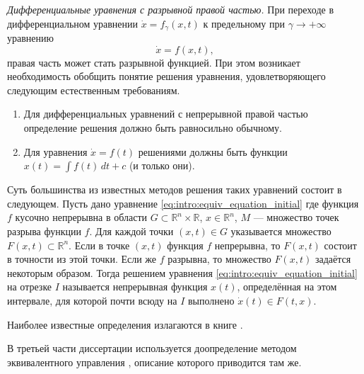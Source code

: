 \textit{Дифференциальные уравнения с разрывной правой частью.} При переходе в дифференциальном уравнении 
$\dot{x} = f_\gamma(x, t)$ к предельному при $\gamma \to +\infty$ уравнению
\begin{equation}
	\label{eq:intro:equiv_equation_initial}
	\dot{x} = f(x, t),
\end{equation}
правая часть может стать разрывной функцией. При этом возникает необходимость обобщить понятие решения уравнения, удовлетворяющего следующим естественным требованиям.
\begin{enumerate}
	\item Для дифференциальных уравнений с непрерывной правой частью определение решения должно быть равносильно обычному.
	\item Для уравнения $\dot{x} = f(t)$ решениями должны быть функции $x(t) = \int f(t)\, dt + c$ (и только они).
\end{enumerate}
Суть большинства из известных методов решения таких уравнений состоит в следующем. Пусть дано уравнение \eqref{eq:intro:equiv_equation_initial} где функция $f$ кусочно непрерывна в области $G \subset \mathbb{R}^n \times \mathbb{R}$, $x \in \mathbb{R}^n$, $M$ --- множество точек разрыва функции $f$. Для каждой точки $(x, t) \in G$ указывается множество $F(x, t) \subset \mathbb{R}^n$. Если в точке $(x, t)$ функция $f$ непрерывна, то $F(x, t)$ состоит в точности из этой точки. Если же $f$ разрывна, то множество $F(x, t)$ задаётся некоторым образом. Тогда решением уравнения \eqref{eq:intro:equiv_equation_initial} на отрезке $I$ называется непрерывная функция $x(t)$, определённая на этом интервале, для которой почти всюду на $I$ выполнено $\dot{x}(t) \in F(t, x)$.

Наиболее известные определения излагаются в книге \cite[\S 4]{Filippov1988}.

В третьей части диссертации используется доопределение методом эквивалентного управления \cite{Utkin1981}, описание которого приводится там же.

\bigskip

